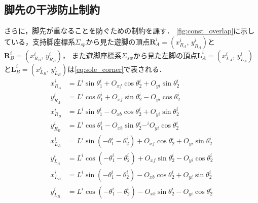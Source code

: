 \documentclass[autodetect-engine,dvipdfmx-if-dvi,ja=standard,a4j,jbase=11pt,magstyle=nomag*]{bxjsreport}
\begin{document}
\subsection{脚先の干渉防止制約}
さらに，脚先が重なることを防ぐための制約を課す．
\cref{fig:const_overlap}に示している，支持脚座標系$\Sigma_{sp}$から見た遊脚の頂点$\bm{R}_A^i = (x_{R_A}^i ,\, y_{R_A}^i)$と$\bm{R}_B^i = (x_{R_B}^i ,\, y_{R_B}^i)$，
また遊脚座標系$\Sigma_{sw}$から見た左脚の頂点$\bm{L}_A^i = (x_{L_A}^i ,\, y_{L_A}^i)$と$\bm{L}_B^i = (x_{L_B}^i ,\, y_{L_B}^i)$は\cref{eq:sole_corner}で表される．
\begin{equation}
\label{eq:sole_corner}
    \begin{aligned}
        x_{R_A}^i & = L^i \sin \theta_1^i + O_{xf} \cos \theta_2^i + O_{yi} \sin \theta_2^i \\
        y_{R_A}^i & = L^i \cos \theta_1^i + O_{xf} \sin \theta_2^i - O_{yi} \cos \theta_2^i \\
        x_{R_B}^i & = L^i \sin \theta_1^i - O_{xb} \cos \theta_2^i + O_{yi} \sin \theta_2^i \\
        y_{R_B}^i & = L^i \cos \theta_1^i - O_{xb} \sin \theta_2^i - ^iO_{yi} \cos \theta_2^i \\
        x_{L_A}^i & = L^i \sin \left( - \theta_1^i - \theta_2^i \right) + O_{xf} \cos \theta_2^i + O_{yi} \sin \theta_2^i \\
        y_{L_A}^i & = L^i \cos \left( - \theta_1^i - \theta_2^i \right) + O_{xf} \sin \theta_2^i - O_{yi} \cos \theta_2^i \\
        x_{L_B}^i & = L^i \sin \left( - \theta_1^i - \theta_2^i \right) - O_{xb} \cos \theta_2^i + O_{yi} \sin \theta_2^i \\
        y_{L_B}^i & = L^i \cos \left( - \theta_1^i - \theta_2^i \right) - O_{xb} \sin \theta_2^i - O_{yi} \cos \theta_2^i 
    \end{aligned}
\end{equation}
%
\end{document}

